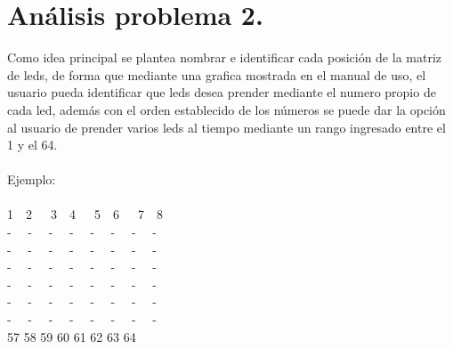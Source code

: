 \documentclass{article}
\begin{document}
\section{Análisis problema 2.}
Como idea principal se plantea nombrar e identificar cada posición de la matriz de leds, de forma que mediante una grafica mostrada en el manual de uso, el usuario pueda identificar que leds desea prender mediante el numero propio de cada led, además con el orden establecido de los números se puede dar la opción al usuario de prender varios leds al tiempo mediante un rango ingresado entre el 1 y el 64.
\\
\\
Ejemplo:
\\
\\
1\  \ 2\ \ \ 3\  \ 4\ \ \ 5\  \ 6\ \ \ 7\  \ 8\\ 
- \  \  - \  \ - \  \ - \  \ - \  \ - \  \ - \   \ -\\
- \  \  - \  \ - \  \ - \  \ - \  \ - \  \ - \   \ -\\
- \  \  - \  \ - \  \ - \  \ - \  \ - \  \ - \   \ -\\
- \  \  - \  \ - \  \ - \  \ - \  \ - \  \ - \   \ -\\
- \  \  - \  \ - \  \ - \  \ - \  \ - \  \ - \   \ -\\
- \  \  - \  \ - \  \ - \  \ - \  \ - \  \ - \   \ -\\
57 58 59 60 61 62 63 64\\
\end{document}

